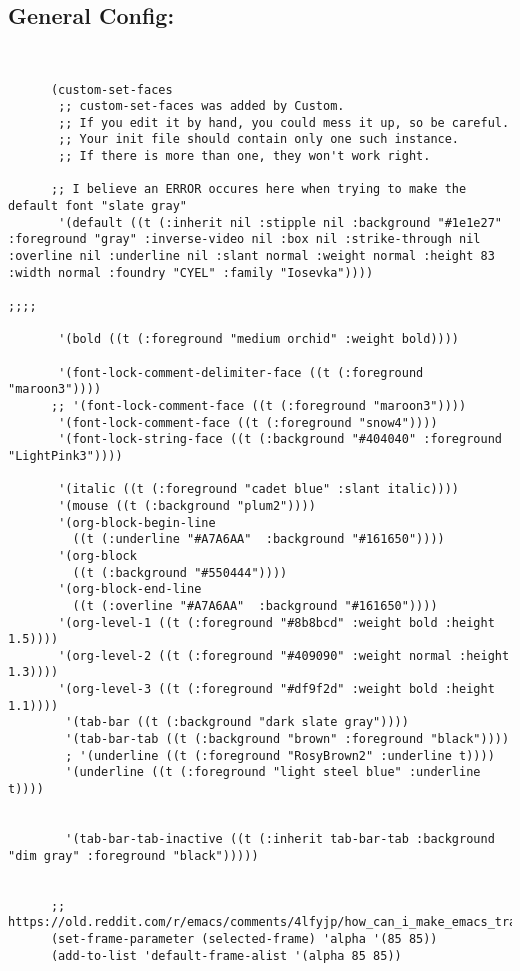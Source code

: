 \documentclass[11pt]{article}
\begin{document}
\subsection{General Config:}
\label{sec:orge454de1}
\begin{verbatim}


      (custom-set-faces
       ;; custom-set-faces was added by Custom.
       ;; If you edit it by hand, you could mess it up, so be careful.
       ;; Your init file should contain only one such instance.
       ;; If there is more than one, they won't work right.

      ;; I believe an ERROR occures here when trying to make the default font "slate gray"
       '(default ((t (:inherit nil :stipple nil :background "#1e1e27" :foreground "gray" :inverse-video nil :box nil :strike-through nil :overline nil :underline nil :slant normal :weight normal :height 83 :width normal :foundry "CYEL" :family "Iosevka"))))

;;;;

       '(bold ((t (:foreground "medium orchid" :weight bold))))

       '(font-lock-comment-delimiter-face ((t (:foreground "maroon3"))))
      ;; '(font-lock-comment-face ((t (:foreground "maroon3"))))
       '(font-lock-comment-face ((t (:foreground "snow4"))))
       '(font-lock-string-face ((t (:background "#404040" :foreground "LightPink3"))))

       '(italic ((t (:foreground "cadet blue" :slant italic))))
       '(mouse ((t (:background "plum2")))) 
       '(org-block-begin-line
         ((t (:underline "#A7A6AA"  :background "#161650"))))
       '(org-block
         ((t (:background "#550444"))))
       '(org-block-end-line
         ((t (:overline "#A7A6AA"  :background "#161650"))))
       '(org-level-1 ((t (:foreground "#8b8bcd" :weight bold :height 1.5))))
       '(org-level-2 ((t (:foreground "#409090" :weight normal :height 1.3))))
       '(org-level-3 ((t (:foreground "#df9f2d" :weight bold :height 1.1))))
        '(tab-bar ((t (:background "dark slate gray"))))
        '(tab-bar-tab ((t (:background "brown" :foreground "black"))))
        ; '(underline ((t (:foreground "RosyBrown2" :underline t))))
        '(underline ((t (:foreground "light steel blue" :underline t))))


        '(tab-bar-tab-inactive ((t (:inherit tab-bar-tab :background "dim gray" :foreground "black")))))


      ;; https://old.reddit.com/r/emacs/comments/4lfyjp/how_can_i_make_emacs_transparent_but_not_the_text/
      (set-frame-parameter (selected-frame) 'alpha '(85 85))
      (add-to-list 'default-frame-alist '(alpha 85 85))




\end{verbatim}
\end{document}

